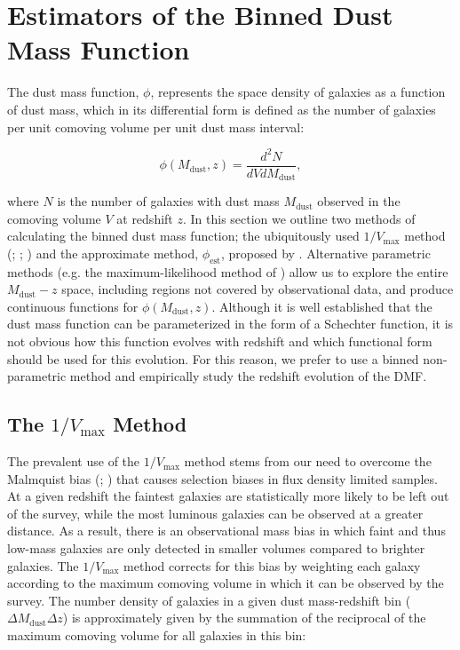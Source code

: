 \section{Estimators of the Binned Dust Mass Function}

The dust mass function, $\phi$, represents the space density of galaxies as a function of dust mass, which in its differential form is defined as the number of galaxies per unit comoving volume per unit dust mass interval:

\begin{equation}
    \phi(M_{\textrm{dust}}, z) = \frac{d^2N}{dV dM_{\textrm{dust}}},
\label{eq:differential_phi}
\end{equation}

\noindent where $N$ is the number of galaxies with dust mass $M_{\textrm{dust}}$ observed in the comoving volume $V$ at redshift $z$. In this section we outline two methods of calculating the binned dust mass function; the ubiquitously used $1/V_{\textrm{max}}$ method (\citealt{Schmidt_1968}; \citealt{Felten_1976}; \citealt{Avni_1980}) and the approximate method, $\phi_{\textrm{est}}$, proposed by \citealt{Page_2000}. Alternative parametric methods (e.g. the maximum-likelihood method of \citealt{Marshall_1983}) allow us to explore the entire $M_{\textrm{dust}} - z$ space, including regions not covered by observational data, and produce continuous functions for $\phi(M_{\textrm{dust}}, z)$. Although it is well established that the dust mass function can be parameterized in the form of a Schechter function, it is not obvious how this function evolves with redshift and which functional form should be used for this evolution. For this reason, we prefer to use a binned non-parametric method and empirically study the redshift evolution of the DMF.

\subsection{The $1/V_{\textrm{max}}$ Method}

The prevalent use of the $1/V_{\textrm{max}}$ method stems from our need to overcome the Malmquist bias (\citealt{Eddington_1914}; \citealt{Malmquist_1922}) that causes selection biases in flux density limited samples. At a given redshift the faintest galaxies are statistically more likely to be left out of the survey, while the most luminous galaxies can be observed at a greater distance. As a result, there is an observational mass bias in which faint and thus low-mass galaxies are only detected in smaller volumes compared to brighter galaxies. The $1/V_{\textrm{max}}$ method corrects for this bias by weighting each galaxy according to the maximum comoving volume in which it can be observed by the survey. The number density of galaxies in a given dust mass-redshift bin ($\Delta M_{\textrm{dust}} \Delta z$) is approximately given by the summation of the reciprocal of the maximum comoving volume for all galaxies in this bin:

